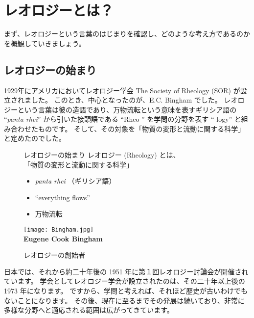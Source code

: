 \documentclass[uplatex,dvipdfmx,a4paper,11pt]{jsarticle}
\begin{document}
\section{レオロジーとは？}

まず、レオロジーという言葉のはじまりを確認し、どのような考え方であるのかを概観していきましょう。

\subsection{レオロジーの始まり}
1929年にアメリカにおいてレオロジー学会 The Society of Rheology (SOR) が設立されました。
このとき、中心となったのが、E.C. Bingham でした。
レオロジーという言葉は彼の造語であり、万物流転という意味を表すギリシア語の ``\textit{panta rhei}'' から引いた接頭語である ``Rheo-'' を学問の分野を表す ``-logy'' と組み合わせたものです。
そして、その対象を「物質の変形と流動に関する科学」と定めたのでした。
\begin{figure}[htb]
	\begin{center}
		\begin{minipage}{0.5\textwidth}
			\large
			\begin{itembox}[l]{レオロジーの始まり}
				レオロジー (Rheology) とは、\\
			「物質の変形と流動に関する科学」
				\begin{itemize}
					\item \textit{panta rhei} （ギリシア語）
					\item ``everything flows''
					\item 万物流転
				\end{itemize}
			\end{itembox}
		\end{minipage}
		\begin{minipage}{0.4\textwidth}
			\begin{center}
				\texttt{[image: Bingham.jpg]}\\
				\large{\bf Eugene Cook Bingham}
			\end{center}
		\end{minipage}
	\end{center}
		\caption{レオロジーの創始者}
		\label{Bingham}
\end{figure}

日本では、それから約二十年後の 1951 年に第１回レオロジー討論会が開催されています。
学会としてレオロジー学会が設立されたのは、その二十年以上後の 1973 年になります。
ですから、学問と考えれば、それほど歴史が古いわけでもないことになります。
その後、現在に至るまでその発展は続いており、非常に多様な分野へと適応される範囲は広がってきています。
\end{document}
